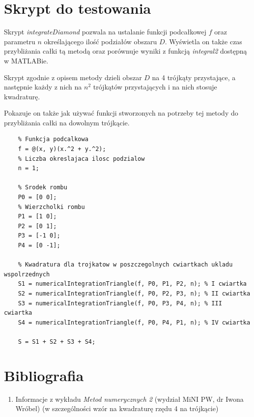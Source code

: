 \documentclass[12pt]{article}
\begin{document}
	
	
	
	
	
	\section{Skrypt do testowania}
	Skrypt \textit{integrateDiamond} pozwala na ustalanie funkcji podcałkowej $f$ oraz parametru $n$ określającego ilość podziałów obszaru $D$. Wyświetla on także czas przybliżania całki tą metodą oraz porównuje wyniki z funkcją \textit{integral2} dostępną w MATLABie.
	
	Skrypt zgodnie z opisem metody dzieli obszar $D$ na 4 trójkąty przystające, a następnie każdy z nich na $n^2$ trójkątów przystających i na nich stosuje kwadraturę.
	
	Pokazuje on także jak używać funkcji stworzonych na potrzeby tej metody do przybliżania całki na dowolnym trójkącie.
	
	\begin{lstlisting}[frame=single]
	% Parametry:
	% Funkcja podcalkowa
	f = @(x, y)(x.^2 + y.^2);
	% Liczba okreslajaca ilosc podzialow
	n = 1;
	
	% Srodek rombu
	P0 = [0 0];
	% Wierzcholki rombu
	P1 = [1 0];
	P2 = [0 1];
	P3 = [-1 0];
	P4 = [0 -1];
	
	% Kwadratura dla trojkatow w poszczegolnych cwiartkach ukladu wspolrzednych
	S1 = numericalIntegrationTriangle(f, P0, P1, P2, n); % I cwiartka
	S2 = numericalIntegrationTriangle(f, P0, P2, P3, n); % II cwiartka
	S3 = numericalIntegrationTriangle(f, P0, P3, P4, n); % III cwiartka
	S4 = numericalIntegrationTriangle(f, P0, P4, P1, n); % IV cwiartka
	
	S = S1 + S2 + S3 + S4;
	\end{lstlisting}
	
	
	
	\section{Bibliografia}
	\begin{enumerate}
		\item Informacje z wykładu \textit{Metod numerycznych 2} (wydział MiNI PW, dr Iwona Wróbel) (w szczególności wzór na kwadraturę rzędu 4 na trójkącie)
	\end{enumerate}
	
\end{document}
